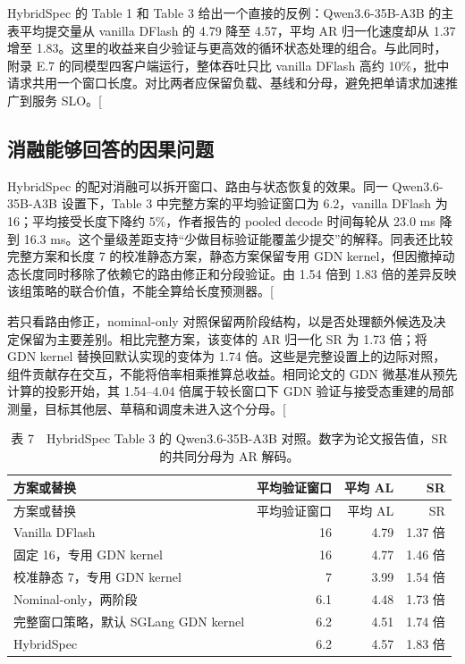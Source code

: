 \documentclass[
  a4paper,
  UTF8,
  fontset=none,
  zihao=5]{ctexart}
\begin{document}
HybridSpec 的 Table 1 和 Table 3 给出一个直接的反例：Qwen3.6-35B-A3B
的主表平均提交量从 vanilla DFlash 的 4.79 降至 4.57，平均 AR
归一化速度却从 1.37 增至
1.83。这里的收益来自少验证与更高效的循环状态处理的组合。与此同时，附录
E.7 的同模型四客户端运行，整体吞吐只比 vanilla DFlash 高约
10\%，批中请求共用一个窗口长度。对比两者应保留负载、基线和分母，避免把单请求加速推广到服务
SLO。{[}\citeproc{ref-hybridspec}{7}{]}

\subsection{消融能够回答的因果问题}\label{ablation-reading}

HybridSpec 的配对消融可以拆开窗口、路由与状态恢复的效果。同一
Qwen3.6-35B-A3B 设置下，Table 3 中完整方案的平均验证窗口为 6.2，vanilla
DFlash 为 16；平均接受长度下降约 5\%，作者报告的 pooled decode
时间每轮从 23.0 ms 降到 16.3
ms。这个量级差距支持``少做目标验证能覆盖少提交''的解释。同表还比较完整方案和长度
7 的校准静态方案，静态方案保留专用 GDN
kernel，但因撤掉动态长度同时移除了依赖它的路由修正和分段验证。由 1.54
倍到 1.83
倍的差异反映该组策略的联合价值，不能全算给长度预测器。{[}\citeproc{ref-hybridspec}{7}{]}

若只看路由修正，nominal-only
对照保留两阶段结构，以是否处理额外候选及决定保留为主要差别。相比完整方案，该变体的
AR 归一化 SR 为 1.73 倍；将 GDN kernel 替换回默认实现的变体为 1.74
倍。这些是完整设置上的边际对照，组件贡献存在交互，不能将倍率相乘推算总收益。相同论文的
GDN 微基准从预先计算的投影开始，其 1.54--4.04 倍属于较长窗口下 GDN
验证与接受态重建的局部测量，目标其他层、草稿和调度未进入这个分母。{[}\citeproc{ref-hybridspec}{7}{]}

\begin{longtable}[]{@{}lrrr@{}}
\caption{表 7　HybridSpec Table 3 的 Qwen3.6-35B-A3B
对照。数字为论文报告值，SR 的共同分母为 AR 解码。}\tabularnewline
\toprule\noalign{}
方案或替换 & 平均验证窗口 & 平均 AL & SR \\
\midrule\noalign{}
\endfirsthead
\toprule\noalign{}
方案或替换 & 平均验证窗口 & 平均 AL & SR \\
\midrule\noalign{}
\endhead
\bottomrule\noalign{}
\endlastfoot
Vanilla DFlash & 16 & 4.79 & 1.37 倍 \\
固定 16，专用 GDN kernel & 16 & 4.77 & 1.46 倍 \\
校准静态 7，专用 GDN kernel & 7 & 3.99 & 1.54 倍 \\
Nominal-only，两阶段 & 6.1 & 4.48 & 1.73 倍 \\
完整窗口策略，默认 SGLang GDN kernel & 6.2 & 4.51 & 1.74 倍 \\
HybridSpec & 6.2 & 4.57 & 1.83 倍 \\
\end{longtable}
\end{document}
